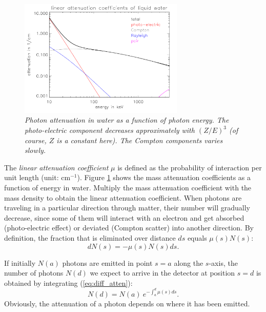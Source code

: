 \documentclass[11pt,oneside]{book}
\begin{document}
\begin{figure}[tb]
\centering
\includegraphics[width=0.7\textwidth]{figs/fig_atten_water.pdf}
\caption{\label{fig:atten_water} \emph{Photon attenuation in water as a
function of photon energy. The photo-electric component decreases
approximately with $(Z/E)^3$ (of course, $Z$ is a constant here). The Compton
components varies slowly.}}
\end{figure}

The {\em linear attenuation coefficient} $\mu$ is defined as the
probability of interaction per unit length (unit: cm$^{-1}$). Figure
\ref{fig:atten_water} shows the mass attenuation coefficients as a
function of energy in water. Multiply the mass attenuation coefficient
with the mass density to obtain the linear attenuation
coefficient. When photons are traveling in a particular direction
through matter, their number will gradually decrease, since some of
them will interact with an electron and get absorbed (photo-electric
effect) or deviated (Compton scatter) into another direction. By
definition, the fraction that is eliminated over distance $ds$ equals
$\mu(s) N(s)$:
\begin{equation}
  dN(s) = - \mu(s) N(s) ds. \label{eq:diff_atten}
\end{equation}

If initially $N(a)$ photons are emitted in point $s = a$ along the $s$-axis,
the number of photons $N(d)$ we expect to arrive in the detector at position
$s = d$ is obtained by integrating (\ref{eq:diff_atten}):
\begin{equation}
  N(d) = N(a) \  e^{- \int_a^d \mu(s) ds}. 
\label{jn:spectatten}
\end{equation}
Obviously, the attenuation of a photon depends on where it has been emitted.
\end{document}
